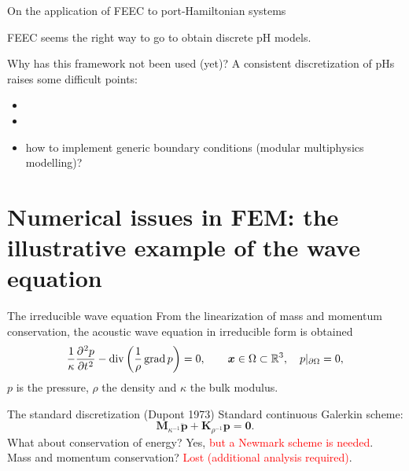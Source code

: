 \documentclass[aspectratio=169]{beamer}
\DeclareMathOperator*{\grad}{grad}
\renewcommand{\div}{\operatorname{div}}
\newcommand{\bbR}{\mathbb{R}}
\begin{document}
\begin{frame}{On the application of FEEC to port-Hamiltonian systems}

FEEC seems the right way to go to obtain discrete pH models. \\

\begin{alertblock}{Why has this framework not been used (yet)?}
A consistent discretization of pHs raises some difficult points:
\begin{itemize}
	\item {} \only<5->{\textcolor{blue}{how to exactly enforce discrete conservation laws?}}
	\item {}
	\item<4-> how to implement generic boundary conditions (modular multiphysics modelling)?
\end{itemize}
\end{alertblock}

\end{frame}

\section{Numerical issues in FEM: the illustrative example of the wave equation}


\begin{frame}{The irreducible wave equation}
From the linearization of mass and momentum conservation, the acoustic wave equation in irreducible form is obtained
\begin{equation*}
\frac{1}{\kappa} \diffp[2]{p}{t} - \div\left(\frac{1}{\rho}\grad p\right) = 0,  \qquad \bm{x} \in \Omega \subset \bbR^3, \quad p|_{\partial\Omega} =0,
\end{equation*}
$p$ is the pressure, $\rho$ the density and $\kappa$ the bulk modulus.


\begin{block}{The standard discretization (Dupont 1973)}
	Standard continuous Galerkin scheme:
	\begin{equation*}
		\mathbf{M}_{\kappa^{-1}} \ddot{\mathbf{p}} + \mathbf{K}_{\rho^{-1}} \mathbf{p} = \mathbf{0}.
	\end{equation*}
	What about conservation of energy? Yes, \textcolor{red}{but a Newmark scheme is needed}.\\
	Mass and momentum conservation? \textcolor{red}{Lost (additional analysis required)}.
\end{block}

\end{frame}
\end{document}
